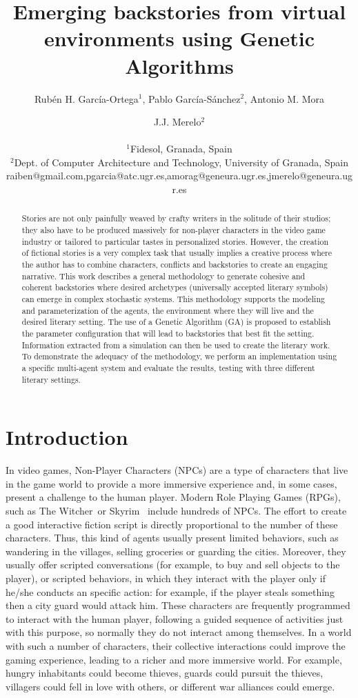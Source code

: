 \documentclass[letterpaper]{article}
\title{Emerging backstories from virtual environments using Genetic Algorithms}
\author{Rub\'en H. Garc\'ia-Ortega$^{1}$, Pablo Garc\'ia-S\'anchez$^{2}$, Antonio M. Mora \and J.J. Merelo$^2$ \\
\mbox{}\\
$^1$Fidesol, Granada, Spain \\
$^2$Dept. of Computer Architecture and Technology, University of Granada, Spain \\
raiben@gmail.com,pgarcia@atc.ugr.es,amorag@geneura.ugr.es,jmerelo@geneura.ugr.es}
\begin{document}
\maketitle

\begin{abstract}
Stories are not only painfully weaved by crafty writers in the
solitude of their studios; they also have to be produced massively for
non-player characters in the video game industry or tailored to
particular tastes in personalized stories. However, the creation of
fictional stories is a very complex task that usually implies a
creative process where the author has to combine characters, 
conflicts and backstories to create an engaging narrative.
This work describes a general methodology to generate cohesive and coherent
backstories where desired archetypes (universally accepted literary symbols) can emerge in complex stochastic systems.
This methodology supports the modeling and parameterization of the agents, the environment where they will live and the desired literary setting. The use of a Genetic Algorithm (GA) is proposed to establish the parameter configuration that will lead to backstories that best fit the setting. Information extracted from a simulation can then be used to create the literary work.
To demonstrate the adequacy of the methodology, we perform an implementation using a specific multi-agent system and evaluate the results, testing with three different literary settings.
\end{abstract}


\section{Introduction}

In video games, Non-Player Characters (NPCs)  are a type of characters
that live in the game world to provide a more immersive
experience and, in some cases, present a challenge to the human player. Modern  Role Playing Games (RPGs), such as The
Witcher\texttrademark~or Skyrim\texttrademark~ include hundreds of NPCs. The effort to create a good interactive fiction script is directly proportional to the number of these characters. Thus, this kind of agents usually present limited behaviors, such as wandering in the villages, selling groceries or guarding the cities. Moreover, they usually offer scripted conversations (for example, to buy and sell objects to the player), or scripted behaviors, in which they interact with the player only if he/she conducts an specific action: for example, if the player steals something then a city guard would attack him. These characters are frequently programmed to interact with the human player, following a guided sequence of activities just with this purpose, so normally they do not interact among themselves. In a world with such a number of characters, their collective interactions could improve the gaming experience, leading to a richer and more immersive world. For example, hungry inhabitants could become thieves, guards could pursuit the thieves, villagers could fell in love with others, or different war alliances could emerge.
\end{document}
